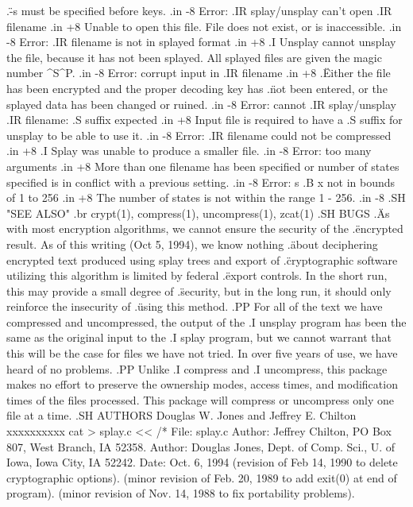.\" -s must be specified before keys.
.in -8
Error:
.IR splay/unsplay
can't open
.IR filename
.in +8
Unable to open this file.  File does not exist, or is inaccessible.
.in -8
Error:
.IR filename
is not in splayed format
.in +8
.I Unsplay
cannot unsplay the file, because it has not been splayed.
All splayed files are given the magic number ^S^P.
.in -8
Error: corrupt input in
.IR filename
.in +8
.\" Either the file has been encrypted and the proper decoding key has
.\" not been entered, or
the splayed data has been changed or ruined.
.in -8
Error: cannot
.IR splay/unsplay
.IR filename: .S
suffix expected
.in +8
Input file is required to have a .S suffix for unsplay to be able to use it.
.in -8
Error:
.IR filename
could not be compressed
.in +8
.I Splay
was unable to produce a smaller file.
.in -8
Error: too many arguments
.in +8
More than one filename has been specified or number of states specified is in
conflict with a previous setting.
.in -8
Error: \-s
.B x
not in bounds of 1 to 256
.in +8
The number of states is not within the range 1 - 256.
.in -8
.SH "SEE ALSO"
.br
crypt(1), compress(1), uncompress(1), zcat(1)
.SH BUGS
.\" As with most encryption algorithms, we cannot ensure the security of the
.\" encrypted result.  As of this writing (Oct 5, 1994), we know nothing
.\" about deciphering encrypted text produced using splay trees and export of
.\" cryptographic software utilizing this algorithm is limited by federal
.\" export controls.  In the short run, this may provide a small degree of
.\" security, but in the long run, it should only reinforce the insecurity of
.\" using this method.
.PP
For all of the text we have compressed and uncompressed, the output of the
.I unsplay
program has been the same as the original input to the
.I splay
program, but we cannot warrant that this will be the case for files
we have not tried.  In over five years of use, we have heard of no problems.
.PP
Unlike
.I compress
and
.I uncompress,
this package makes no effort to preserve the ownership modes, access times,
and modification times of the files processed.
This package will compress or uncompress only one file at a time.
.SH AUTHORS
Douglas W. Jones and Jeffrey E. Chilton
xxxxxxxxxx
cat > splay.c <<\xxxxxxxxxx
/* File: splay.c
   Author: Jeffrey Chilton, PO Box 807, West Branch, IA 52358.
   Author: Douglas Jones, Dept. of Comp. Sci., U. of Iowa, Iowa City, IA 52242.
   Date: Oct. 6, 1994
	 (revision of Feb 14, 1990 to delete cryptographic options).
	 (minor revision of Feb. 20, 1989 to add exit(0) at end of program).
	 (minor revision of Nov. 14, 1988 to fix portability problems).
